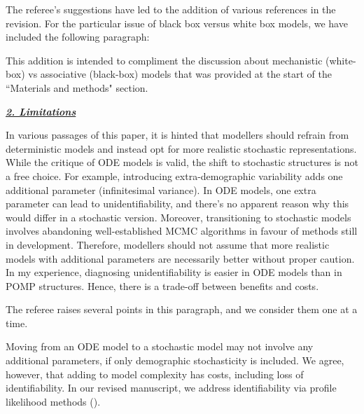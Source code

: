 \documentclass[11pt]{article}
\newcommand\report[1]{{\color{mygreen} \vspace{1mm}\hspace{0.25in}\parbox{6in}{\em #1}}}
\newcommand\article[1]{{\color{blue} \vspace{1mm}\hspace{0.25in}\parbox{6in}{\em #1}}}
\begin{document}
The referee's suggestions have led to the addition of various references in the revision.
For the particular issue of black box versus white box models, we have included the following paragraph:

\article{\editMechModels}

This addition is intended to compliment the discussion about mechanistic (white-box) vs associative (black-box) models that was provided at the start of the ``Materials and methods" section.

\report{
\textbf{\underline{2. Limitations}}

In various passages of this paper, it is hinted that modellers should refrain from deterministic models and instead opt for more realistic stochastic representations. While the critique of ODE models is valid, the shift to stochastic structures is not a free choice. For example, introducing extra-demographic variability adds one additional parameter (infinitesimal variance). In ODE models, one extra parameter can lead to unidentifiability, and there's no apparent reason why this would differ in a stochastic version. Moreover, transitioning to stochastic models involves abandoning well-established MCMC algorithms in favour of methods still in development. Therefore, modellers should not assume that more realistic models with additional parameters are necessarily better without proper caution. In my experience, diagnosing unidentifiability is easier in ODE models than in POMP structures. Hence, there is a trade-off between benefits and costs.
}

The referee raises several points in this paragraph, and we consider them one at a time.

Moving from an ODE model to a stochastic model may not involve any additional parameters, if only demographic stochasticity is included.
We agree, however, that adding to model complexity has costs, including loss of identifiability.
In our revised manuscript, we address identifiability via profile likelihood methods ().
\end{document}
